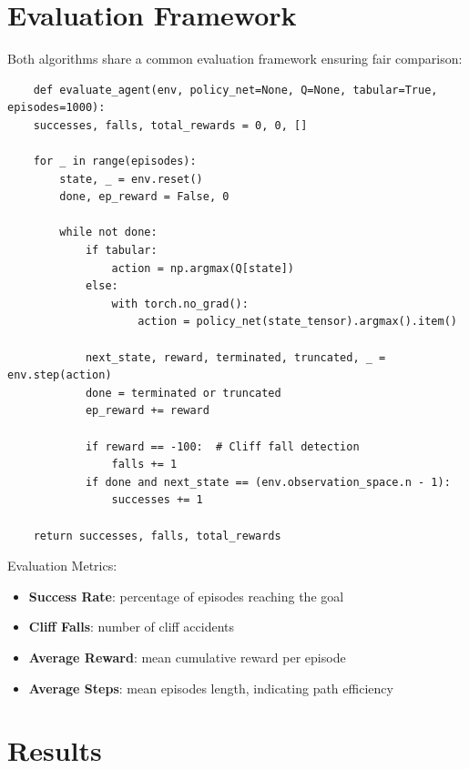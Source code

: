 \documentclass[a4paper,12pt]{article}
\begin{document}
\section{Evaluation Framework}
Both algorithms share a common evaluation framework ensuring fair comparison:
\begin{lstlisting}
    def evaluate_agent(env, policy_net=None, Q=None, tabular=True, episodes=1000):
    successes, falls, total_rewards = 0, 0, []
    
    for _ in range(episodes):
        state, _ = env.reset()
        done, ep_reward = False, 0
        
        while not done:
            if tabular:
                action = np.argmax(Q[state])
            else:
                with torch.no_grad():
                    action = policy_net(state_tensor).argmax().item()
            
            next_state, reward, terminated, truncated, _ = env.step(action)
            done = terminated or truncated
            ep_reward += reward
            
            if reward == -100:  # Cliff fall detection
                falls += 1
            if done and next_state == (env.observation_space.n - 1):
                successes += 1
                
    return successes, falls, total_rewards
\end{lstlisting}
Evaluation Metrics:
\begin{itemize}
    \item \textbf{Success Rate}: percentage of episodes reaching the goal
    \item \textbf{Cliff Falls}: number of cliff accidents
    \item \textbf{Average Reward}: mean cumulative reward per episode
    \item \textbf{Average Steps}: mean episodes length, indicating path efficiency
\end{itemize}
\section{Results}
\end{document}
